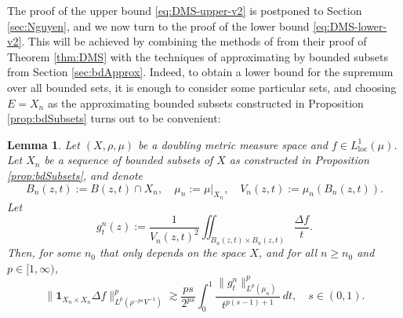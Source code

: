 \documentclass[11pt]{amsart}
\newtheorem{lemma}[theorem]{Lemma}
\theoremstyle{definition}
\theoremstyle{remark}
\numberwithin{equation}{section}
\newcommand{\Norm}[2]{\|#1\|_{#2}}
\begin{document}
The proof of the upper bound \eqref{eq:DMS-upper-v2} is postponed to Section
\ref{sec:Nguyen},
and we now turn to the proof of the lower bound \eqref{eq:DMS-lower-v2}.
This will be achieved by combining the methods of \cite{DMS} from their proof of Theorem
\ref{thm:DMS}
 with the techniques of approximating by bounded subsets from Section
 \ref{sec:bdApprox}.
Indeed, to obtain a lower bound for the supremum over all bounded sets, it is enough to
consider
some particular sets, and choosing $E=X_n$ as the approximating bounded subsets
constructed in Proposition \ref{prop:bdSubsets} turns out to be convenient:

\begin{lemma}\label{lem:gnt}
Let $(X,\rho,\mu)$ be a doubling metric measure space and $f\in L^1_{\mathrm{loc}}(\mu)$.
Let $X_n$ be a sequence of bounded subsets of $X$ as constructed in Proposition
\ref{prop:bdSubsets},
and denote
\begin{equation*}
  B_n(z,t):=B(z,t)\cap X_n,\quad
  \mu_n:=\mu|_{X_n},\quad
  V_n(z,t):=\mu_n(B_n(z,t)).
\end{equation*}
Let
\begin{equation}\label{eq:gnt}
   g_t^n(z):=\frac{1}{V_n(z,t)^2}\iint_{B_n(z,t)\times B_n(z,t)}\frac{\Delta f}{t}.
\end{equation}
Then, for some $n_0$ that only depends on the space $X$, and for all $n\geq n_0$ and
$p\in[1,\infty)$,
\begin{equation}
 \Norm{\mathbf{1}_{X_n\times X_n}\Delta f}{L^p(\rho^{-ps}V^{-1})}^p
   \gtrsim \frac{ps}{2^{ps}}\int_0^1\frac{\Norm{g_t^n}{L^p(\mu_n)}^p}{t^{p(s-1)+1}}\,dt,
   \quad s\in(0,1).
\label{eq:weakLp>limsup}
\end{equation}
\end{lemma}
\end{document}
